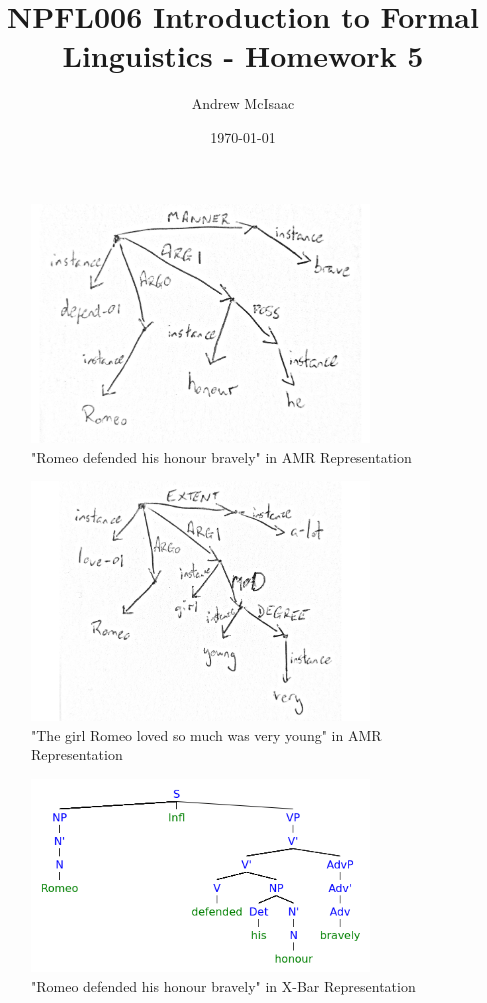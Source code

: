 \documentclass[a4paper]{article}
\title{NPFL006 Introduction to Formal Linguistics - Homework 5}
\date{\today}
\author{Andrew McIsaac}
\begin{document}
\maketitle
	\begin{figure}[htpb]
		\centering
		\includegraphics[width=0.8\textwidth]{i_amr}
		\caption{"Romeo defended his honour bravely" in AMR Representation}
		\label{fig:i_amr}
	\end{figure}

	\begin{figure}[htpb]
		\centering
		\includegraphics[width=0.8\textwidth]{ii_amr}
		\caption{"The girl Romeo loved so much was very young"
		in AMR Representation}
		\label{fig:ii_amr}
	\end{figure}


	\begin{figure}[htpb]
		\centering
		\includegraphics[width=0.8\textwidth]{i_xbar}
		\caption{"Romeo defended his honour bravely" in X-Bar Representation}
		\label{fig:i_xbar}
	\end{figure}
\end{document}
